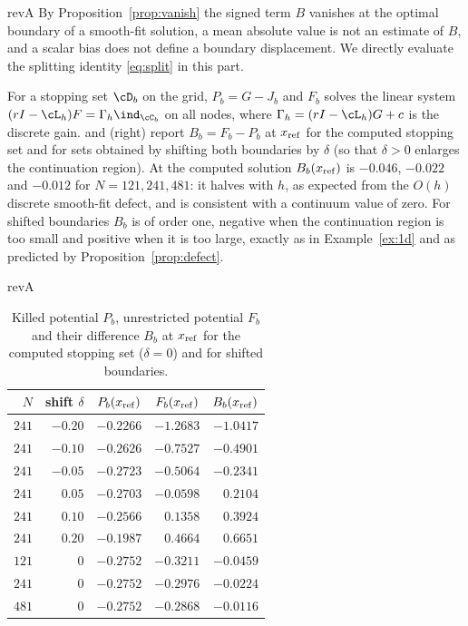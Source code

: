 \begin{rv}{revA}{}
By Proposition~\ref{prop:vanish} the signed term $B$
vanishes at the optimal boundary of a smooth-fit solution, a mean absolute value is not an estimate
of $B$, and a scalar bias does not define a boundary displacement. We directly evaluate the splitting identity \eqref{eq:split} in this part.

For a stopping set $\cD_b$ on the grid, $P_b=G-J_b$ and $F_b$ solves the linear system
$(rI-\cL_h)F=\Gamma_h\ind_{\cC_b}$ on all nodes, where $\Gamma_h=(rI-\cL_h)G+c$ is the discrete gain.
 and  (right) report $B_b=F_b-P_b$ at $x_{\rm ref}$ for the computed
stopping set and for sets obtained by shifting both boundaries by $\delta$ (so that $\delta>0$
enlarges the continuation region). At the computed solution $B_b(x_{\rm ref})$ is $-0.046$, $-0.022$
and $-0.012$ for $N=121,241,481$: it halves with $h$, as expected from the $O(h)$ discrete
smooth-fit defect, and is consistent with a continuum value of zero. For shifted boundaries $B_b$ is
of order one, negative when the continuation region is too small and positive when it is too large,
exactly as in Example~\ref{ex:1d} and as predicted by Proposition~\ref{prop:defect}.

\begin{table}[htbp]
\begin{rv}{revA}{}
\centering\small
\caption{Killed potential $P_b$, unrestricted potential $F_b$ and their difference $B_b$ at
$x_{\rm ref}$ for the computed stopping set ($\delta=0$) and for shifted boundaries.}\label{tab:bias}
\begin{tabular}{@{}rrrrr@{}}
\toprule
$N$ & shift $\delta$ & $P_b(x_{\rm ref})$ & $F_b(x_{\rm ref})$ & $B_b(x_{\rm ref})$\\
\midrule
$241$ & $-0.20$ & $-0.2266$ & $-1.2683$ & $-1.0417$\\
$241$ & $-0.10$ & $-0.2626$ & $-0.7527$ & $-0.4901$\\
$241$ & $-0.05$ & $-0.2723$ & $-0.5064$ & $-0.2341$\\
$241$ & $0.05$ & $-0.2703$ & $-0.0598$ & $0.2104$\\
$241$ & $0.10$ & $-0.2566$ & $0.1358$ & $0.3924$\\
$241$ & $0.20$ & $-0.1987$ & $0.4664$ & $0.6651$\\
\midrule
$121$ & $0$ & $-0.2752$ & $-0.3211$ & $-0.0459$\\
$241$ & $0$ & $-0.2752$ & $-0.2976$ & $-0.0224$\\
$481$ & $0$ & $-0.2752$ & $-0.2868$ & $-0.0116$\\
\bottomrule
\end{tabular}
\end{rv}
\end{table}


\end{rv}
